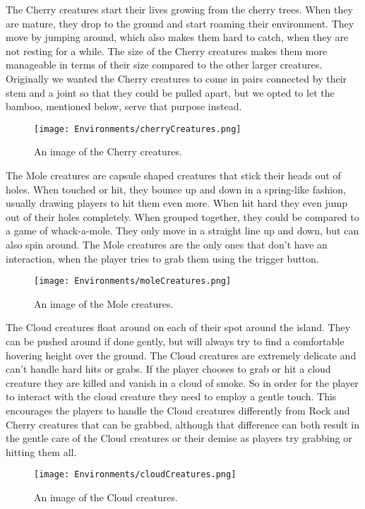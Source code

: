 The Cherry creatures start their lives growing from the cherry trees. When they are mature, they drop to the ground and start roaming their environment. They move by jumping around, which also makes them hard to catch, when they are not resting for a while. The size of the Cherry creatures makes them more manageable in terms of their size compared to the other larger creatures. Originally we wanted the Cherry creatures to come in pairs connected by their stem and a joint so that they could be pulled apart, but we opted to let the bamboo, mentioned below, serve that purpose instead.

\begin{figure}[h]
\centering
\texttt{[image: Environments/cherryCreatures.png]}
\caption{An image of the Cherry creatures.}
\label{fig:cherryCreatures}
\end{figure}

The Mole creatures are capsule shaped creatures that stick their heads out of holes. When touched or hit, they bounce up and down in a spring-like fashion, usually drawing players to hit them even more. When hit hard they even jump out of their holes completely. When grouped together, they could be compared to a game of whack-a-mole.  They only move in a straight line up and down, but can also spin around. The Mole creatures are the only ones that don't have an interaction, when the player tries to grab them using the trigger button.

\begin{figure}[h]
\centering
\texttt{[image: Environments/moleCreatures.png]}
\caption{An image of the Mole creatures.}
\label{fig:moleCreatures}
\end{figure}

The Cloud creatures float around on each of their spot around the island. They can be pushed around if done gently, but will always try to find a comfortable hovering height over the ground. The Cloud creatures are extremely delicate and can't handle hard hits or grabs. If the player chooses to grab or hit a cloud creature they are killed and vanish in a cloud of smoke. So in order for the player to interact with the cloud creature they need to employ a gentle touch. This encourages the players to handle the Cloud creatures differently from Rock and Cherry creatures that can be grabbed, although that difference can both result in the gentle care of the Cloud creatures or their demise as players try grabbing or hitting them all.

\begin{figure}[h]
\centering
\texttt{[image: Environments/cloudCreatures.png]}
\caption{An image of the Cloud creatures.}
\label{fig:cloudCreatures}
\end{figure}

